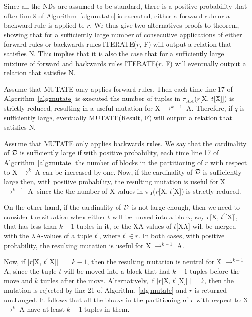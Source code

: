 Since all the NDs are assumed to be standard, 
there is a positive probability that after line 8 of
Algorithm~\ref{alg:mutate} is executed, either a forward rule or a backward rule is
applied to $r$. We thus give two alternatives proofs to theorem,
showing that for a sufficiently large number of consecutive applications of 
either forward rules or backwards rules ITERATE($r$, F) 
will output a relation that satisfies N.
This implies that it is also the case that for a sufficiently large 
mixture of forward and backwards rules ITERATE($r$, F) 
will eventually output a relation that satisfies N.

\medskip

Assume that MUTATE only applies forward rules. 
Then each time line 17 of Algorithm~\ref{alg:mutate} is executed the number 
of tuples in $\pi_{XA}$($r$[X, $t$[X]]) is strictly reduced,
resulting in a useful mutation for X $\to^{k-1}$ A. 
Therefore, if $q$ is sufficiently large, 
eventually MUTATE(Result, F) will output a relation that satisfies N.

\smallskip

Assume that MUTATE only applies backwards rules.
We say that the cardinality of $\cal D$ is sufficiently large if
with positive probability, each time line 17 of Algorithm~\ref{alg:mutate} the 
number of blocks in the partitioning of $r$ with respect to X $\to^k$ A 
can be increased by one.
Now, if the cardinality of $\cal D$ is sufficiently large then,
with positive probability, the resulting mutation is useful for X $\to^{k-1}$ A,
since the the number of X-values in $\pi_{A}$($r$[X, $t$[X]) 
is strictly reduced.



On the other hand, if the cardinality of $\cal D$ is not large enough, 
then we need to consider the situation when  
either $t$ will be moved into a block, say $r$[X, $t^\prime$[X]], 
that has less than $k - 1$ tuples in it,
or the XA-values of $t$[XA] will be merged with the 
XA-values of a tuple $t^\prime$, where $t^\prime \in r$. 
In both cases, with positive probability, the  resulting mutation is
useful for X $\to^{k-1}$ A.

Now, if $\mid r$[X, $t^\prime$[X]] $\mid = k-1$, then the
resulting mutation is neutral for X $\to^{k-1}$ A,
since the tuple $t$ will be moved into a block
that had $k-1$ tuples before the move and $k$ tuples after the move.
Alternatively, if $\mid r$[X, $t^\prime$[X]] $\mid = k$, then the
mutation is rejected by line 21 of Algorithm~\ref{alg:mutate} 
and $r$ is returned unchanged. 
It follows that all the blocks in the partitioning of $r$ 
with respect to X $\to^k$ A have at least $k-1$ tuples in them.

